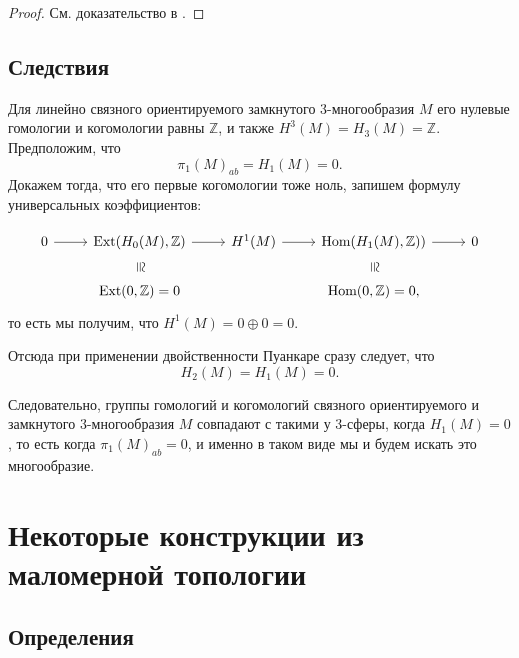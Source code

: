 \documentclass[a4paper, 12pt]{article}
\begin{document}
        \begin{proof}
            См. доказательство в \cite[Chapter~3,~Section~3.1]{Hatcher2001-hm}.
        \end{proof}

    \subsection{Следствия}

        Для линейно связного ориентируемого замкнутого 3-многообразия $M$ его нулевые гомологии и когомологии равны $\mathbb{Z}$, и также $H^3(M) = H_3(M) = \mathbb{Z}$. Предположим, что \begin{equation*} \pi_1(M)_{ab} = H_1(M) = 0. \end{equation*} Докажем тогда, что его первые когомологии тоже ноль, запишем формулу универсальных коэффициентов:


            \[ \begin{tikzcd}
                0 & {\textnormal{Ext}(H_0(M), \mathbb{Z}) } \arrow[draw=none]{d}[marking]{\cong} & {H^1(M)} & {\textnormal{Hom}(H_1(M), \mathbb{Z})) } \arrow[draw=none]{d}[marking]{\cong} & 0 \\
                & {\textnormal{Ext}(0, \mathbb{Z}) = 0} & & \textnormal{Hom}(0, \mathbb{Z}) = 0,
                \arrow[from=1-1, to=1-2]
                \arrow[from=1-2, to=1-3]
                \arrow[from=1-3, to=1-4]
                \arrow[from=1-4, to=1-5]
            \end{tikzcd} \]
        то есть мы получим, что $H^1(M) = 0 \oplus 0 = 0$. 
    
        Отсюда при применении двойственности Пуанкаре сразу следует, что \[H_2(M) = H_1(M) = 0.\]
    
        Следовательно, группы гомологий и когомологий связного ориентируемого и замкнутого 3-многообразия $M$ совпадают с такими у 3-сферы, когда $H_1(M) = 0$, то есть когда $\pi_1(M)_{ab} = 0$, и именно в таком виде мы и будем искать это многообразие. 
    

\section{Некоторые конструкции из маломерной топологии}

    \subsection{Определения}
    
\end{document}
